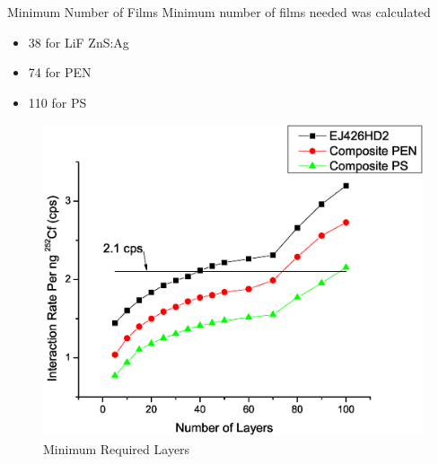 \begin{frame}{Minimum Number of Films}
	\small
	Minimum number of films needed was calculated
	\tiny
	\begin{itemize}
		\item 38 for LiF ZnS:Ag
		\item 74 for PEN
		\item 110 for PS
	\end{itemize}
	\tiny
	\begin{figure}
		\centering
		\includegraphics[height=0.6\textheight]{images/OptimalDetectorSize.eps}
		\tiny \caption{Minimum Required Layers}
	\end{figure}
\end{frame}
